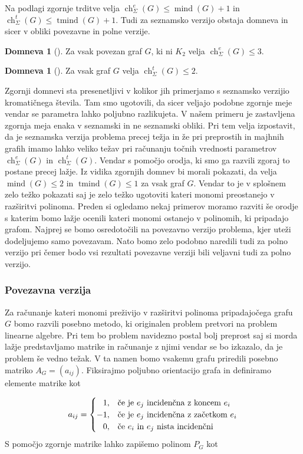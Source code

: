 \documentclass[12pt,a4paper,twoside]{article}
\theoremstyle{definition} %
\newtheorem{domneva}[definicija]{Domneva}
\theoremstyle{plain} %
\newcommand{\ecl}{\ch_{\Sigma}^e}
\newcommand{\eclt}{\ch_{\Sigma}^t}
\numberwithin{equation}{section}  %
\DeclareMathOperator{\mind}{mind}
\DeclareMathOperator{\tmind}{tmind}
\DeclareMathOperator{\ch}{ch}
\begin{document}
Na podlagi zgornje trditve velja $\ecl(G) \le \mind(G) + 1$ in $\eclt(G) \le \tmind(G) + 1$. Tudi za seznamsko verzijo obstaja domneva in sicer v obliki povezavne in polne verzije.

 \begin{domneva}[\cite{alg_org}]
Za vsak povezan graf $G$, ki ni $K_2$ velja $\ecl(G) \le 3$.
\end{domneva}

 \begin{domneva}[\cite{algebraic}]
Za vsak  graf $G$ velja $\eclt(G) \le 2$.
\end{domneva}
Zgornji domnevi sta presenetljivi v kolikor jih primerjamo s seznamsko verzijio kromatičnega števila. Tam smo ugotovili, da sicer veljajo podobne zgornje meje vendar se parametra lahko poljubno razlikujeta. V našem primeru je zastavljena zgornja meja enaka v seznamski in ne seznamski obliki. Pri tem velja izpostavit, da je seznamska verzija problema precej težja in že pri preprostih in majhnih grafih imamo lahko veliko težav pri računanju točnih vrednosti parametrov $\ecl(G)$ in $\eclt(G)$. Vendar s pomočjo orodja, ki smo ga razvili zgoraj to postane precej lažje. Iz vidika zgornjih domnev bi morali pokazati, da velja $\mind(G) \le 2 $ in $\tmind(G) \le 1$ za vsak graf $G$. Vendar to je v splošnem zelo težko pokazati saj je zelo težko ugotoviti kateri monomi preostanejo v razširitvi polinoma. Preden si ogledamo nekaj primerov moramo razviti še orodje s katerim bomo lažje ocenili kateri monomi ostanejo v polinomih, ki pripadajo grafom. Najprej se bomo osredotočili na povezavno verzijo problema, kjer uteži dodeljujemo samo povezavam. Nato bomo zelo podobno naredili tudi za polno verzijo pri čemer bodo vsi rezultati povezavne verziji bili veljavni tudi za polno verzijo.

\subsubsection{Povezavna verzija}
Za računanje kateri monomi preživijo v razširitvi polinoma pripadajočega grafu $G$ bomo razvili posebno metodo, ki originalen problem pretvori na problem linearne algebre. Pri tem bo problem navidezno postal bolj preprost saj si morda lažje predstavljamo matrike in računanje z njimi vendar se bo izkazalo, da je problem še vedno težak.
 V ta namen bomo vsakemu grafu priredili posebno matriko $A_G = (a_{ij})$. Fiksirajmo poljubno orientacijo grafa in definiramo elemente matrike kot 

\begin{equation*}
a_{ij} = 
\begin{cases}

\phantom{-}1, & \text{če je $e_j$ incidenčna z koncem $e_i$}\\ 
	-1, & \text{če je $ e_j$ incidenčna z začetkom  $e_i$} \\

\phantom{-}0, & \text{če $e_i$ in $e_j$ nista incidenčni}
\end{cases}
\end{equation*}
S pomočjo zgornje matrike lahko zapišemo polinom $P_G$ kot
\end{document}
